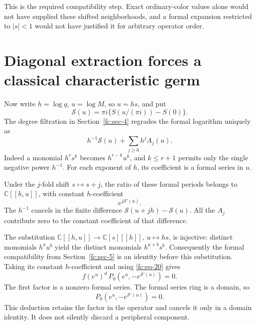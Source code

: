 This is the required compatibility step. Exact ordinary-color values alone would not have supplied these shifted neighborhoods, and a formal expansion restricted to \(|s|<1\) would not have justified it for arbitrary operator order.

\section{Diagonal extraction forces a classical characteristic germ}\label{fc:sec-6}

Now write \(h=\log q\), \(u=\log M\), so \(u=hs\), and put
\begin{equation}\label{fc:eq-21}
\mathcal S(u)=\pi i\{S(u/(\pi i))-S(0)\}.
\end{equation}
 The degree filtration in Section~\ref{fc:sec-4} regrades the formal logarithm uniquely as
\begin{equation}\label{fc:eq-22}
h^{-1}\mathcal S(u)+\sum_{j\ge0}h^j A_j(u).
\end{equation}
 Indeed a monomial \(h^rs^k\) becomes \(h^{r-k}u^k\), and \(k\le r+1\) permits only the single negative power \(h^{-1}\). For each exponent of \(h\), its coefficient is a formal series in \(u\).

Under the \(j\)-fold shift \(s\mapsto s+j\), the ratio of these formal periods belongs to \(\mathbb C[[h,u]]\), with constant \(h\)-coefficient
\begin{equation}\label{fc:eq-23}
e^{j\mathcal S'(u)}.
\end{equation}
 The \(h^{-1}\) cancels in the finite difference \(\mathcal S(u+jh)-\mathcal S(u)\). All the \(A_j\) contribute zero to the constant coefficient of that difference.

The substitution \(\mathbb C[[h,u]]\to\mathbb C[s][[h]]\), \(u\mapsto hs\), is injective: distinct monomials \(h^au^b\) yield the distinct monomials \(h^{a+b}s^b\). Consequently the formal compatibility from Section~\ref{fc:sec-5} is an identity before this substitution. Taking its constant \(h\)-coefficient and using \eqref{fc:eq-20} gives
\begin{equation}\label{fc:eq-24}
f(e^u)^d\,P_0(e^u,-e^{\mathcal S'(u)})=0.
\end{equation}
 The first factor is a nonzero formal series. The formal series ring is a domain, so
\begin{equation}\label{fc:eq-25}
P_0(e^u,-e^{\mathcal S'(u)})=0.
\end{equation}
 This deduction retains the factor in the operator and cancels it only in a domain identity. It does not silently discard a peripheral component.

